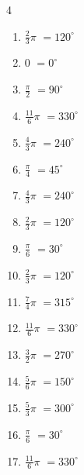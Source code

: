 \begin{multicols}{4}
\begin{enumerate}
  \item $\displaystyle \frac{2}{3}\pi$
        $\displaystyle =120^{\circ}$

  \item $\displaystyle 0$
        $\displaystyle =0^{\circ}$

  \item $\displaystyle \frac{\pi}{2}$
        $\displaystyle =90^{\circ}$

  \item $\displaystyle \frac{11}{6}\pi$
        $\displaystyle =330^{\circ}$

  \item $\displaystyle \frac{4}{3}\pi$
        $\displaystyle =240^{\circ}$

  \item $\displaystyle \frac{\pi}{4}$
        $\displaystyle =45^{\circ}$

  \item $\displaystyle \frac{4}{3}\pi$
        $\displaystyle =240^{\circ}$

  \item $\displaystyle \frac{2}{3}\pi$
        $\displaystyle =120^{\circ}$

  \item $\displaystyle \frac{\pi}{6}$
        $\displaystyle =30^{\circ}$

  \item $\displaystyle \frac{2}{3}\pi$
        $\displaystyle =120^{\circ}$

  \item $\displaystyle \frac{7}{4}\pi$
        $\displaystyle =315^{\circ}$

  \item $\displaystyle \frac{11}{6}\pi$
        $\displaystyle =330^{\circ}$

  \item $\displaystyle \frac{3}{2}\pi$
        $\displaystyle =270^{\circ}$

  \item $\displaystyle \frac{5}{6}\pi$
        $\displaystyle =150^{\circ}$

  \item $\displaystyle \frac{5}{3}\pi$
        $\displaystyle =300^{\circ}$

  \item $\displaystyle \frac{\pi}{6}$
        $\displaystyle =30^{\circ}$

\columnbreak %

  \item $\displaystyle \frac{11}{6}\pi$
        $\displaystyle =330^{\circ}$


\end{enumerate}
\end{multicols}
